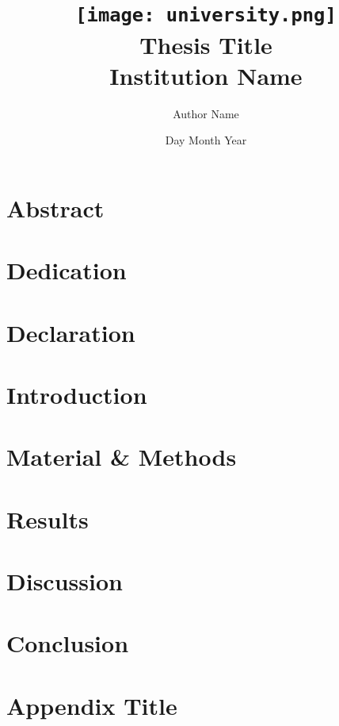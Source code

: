 \documentclass[12pt]{report} %
\title{
	{\texttt{[image: university.png]}}\\
	{Thesis Title}\\
	{\large Institution Name}\\
}
\author{Author Name}
\date{Day Month Year}
\begin{document}
\maketitle

\chapter{Abstract}


\chapter{Dedication}


\chapter{Declaration}


\tableofcontents

\chapter{Introduction}


\chapter{Material \& Methods}


\chapter{Results}


\chapter{Discussion}


\chapter{Conclusion}


\appendix
\chapter{Appendix Title}

\end{document}
